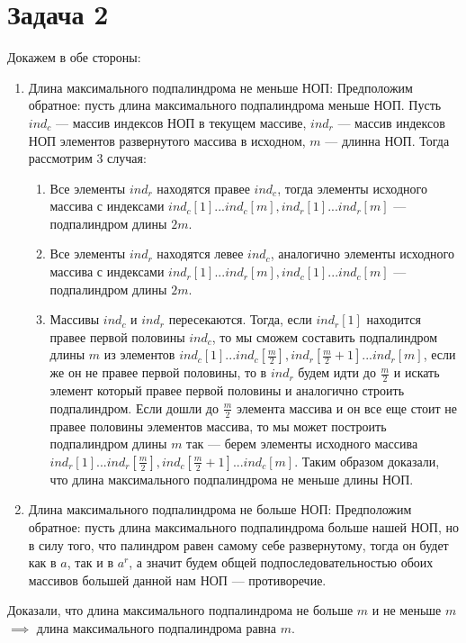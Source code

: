 \documentclass{article}
\begin{document}
\section{Задача 2}
Докажем в обе стороны:\newline
\begin{enumerate}
\item Длина максимального подпалиндрома не меньше НОП:\newline
Предположим обратное: пусть длина максимального подпалиндрома меньше НОП. Пусть $ind_c$ --- массив индексов НОП в текущем массиве, $ind_r$ --- массив индексов НОП элементов развернутого массива в исходном, $m$ --- длинна НОП. Тогда рассмотрим 3 случая:\newline
\begin{enumerate}
\item Все элементы $ind_r$ находятся правее $ind_c$, тогда элементы исходного массива с индексами \newline $ind_c[1]... ind_c[m], ind_r[1]...ind_r[m]$ --- подпалиндром длины $2m$.
\item Все элементы $ind_r$ находятся левее $ind_c$, аналогично элементы исходного массива с индексами \newline $ind_r[1]... ind_r[m], ind_c[1]...ind_c[m]$ --- подпалиндром длины $2m$.
\item Массивы $ind_c$ и $ind_r$ пересекаются. Тогда, если $ind_r[1]$ находится правее первой половины $ind_c$, то мы сможем составить подпалиндром длины $m$ из элементов $ind_c[1]...ind_c[\frac{m}{2}],ind_r[\frac{m}{2} + 1]...ind_r[m]$, если же он не правее первой половины, то в $ind_r$ будем идти до $\frac{m}{2}$ и искать элемент который правее первой половины и аналогично строить подпалиндром.\newline
Если дошли до $\frac{m}{2}$ элемента массива и он все еще стоит не правее половины элементов массива, то мы может построить подпалиндром длины $m$ так --- берем элементы исходного массива \newline $ind_r[1]...ind_r[\frac{m}{2}],ind_c[\frac{m}{2} + 1]...ind_c[m]$.\newline
Таким образом доказали, что длина максимального подпалиндрома не меньше длины НОП.
\end{enumerate}
\item Длина максимального подпалиндрома не больше НОП:\newline
Предположим обратное: пусть длина максимального подпалиндрома больше нашей НОП, но  в силу того, что палиндром равен самому себе развернутому, тогда он будет как в $a$, так и в $a^r$, а значит будем общей подпоследовательностью обоих массивов большей данной нам НОП --- противоречие.
\end{enumerate}
Доказали, что длина максимального подпалиндрома не больше $m$ и не меньше $m$ $\implies$ длина максимального подпалиндрома равна $m$.
\end{document}
